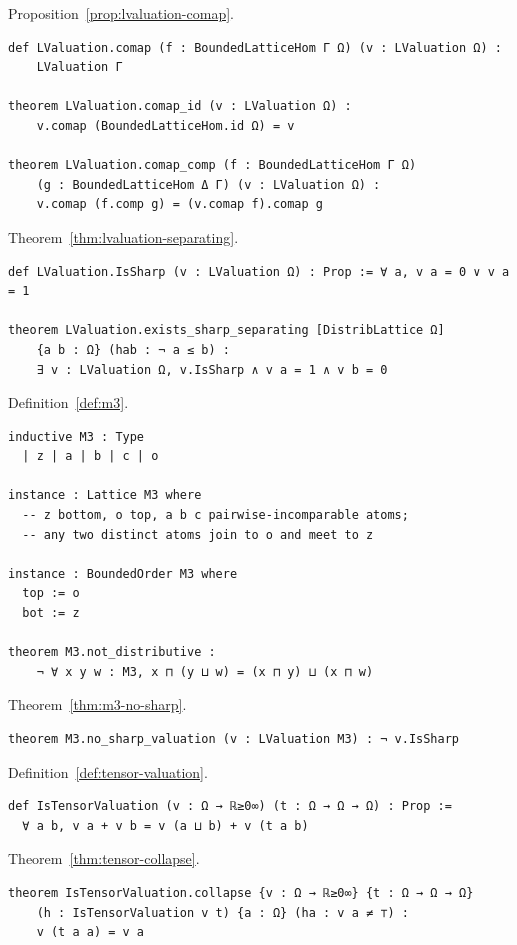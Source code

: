 \noindent Proposition~\ref{prop:lvaluation-comap}.
\label{lean:lvaluation-comap}
\begin{lstlisting}
def LValuation.comap (f : BoundedLatticeHom Γ Ω) (v : LValuation Ω) :
    LValuation Γ

theorem LValuation.comap_id (v : LValuation Ω) :
    v.comap (BoundedLatticeHom.id Ω) = v

theorem LValuation.comap_comp (f : BoundedLatticeHom Γ Ω)
    (g : BoundedLatticeHom Δ Γ) (v : LValuation Ω) :
    v.comap (f.comp g) = (v.comap f).comap g
\end{lstlisting}

\noindent Theorem~\ref{thm:lvaluation-separating}.
\label{lean:lvaluation-separating}
\begin{lstlisting}
def LValuation.IsSharp (v : LValuation Ω) : Prop := ∀ a, v a = 0 ∨ v a = 1

theorem LValuation.exists_sharp_separating [DistribLattice Ω]
    {a b : Ω} (hab : ¬ a ≤ b) :
    ∃ v : LValuation Ω, v.IsSharp ∧ v a = 1 ∧ v b = 0
\end{lstlisting}

\noindent Definition~\ref{def:m3}.
\label{lean:m3}
\begin{lstlisting}
inductive M3 : Type
  | z | a | b | c | o

instance : Lattice M3 where
  -- z bottom, o top, a b c pairwise-incomparable atoms;
  -- any two distinct atoms join to o and meet to z

instance : BoundedOrder M3 where
  top := o
  bot := z

theorem M3.not_distributive :
    ¬ ∀ x y w : M3, x ⊓ (y ⊔ w) = (x ⊓ y) ⊔ (x ⊓ w)
\end{lstlisting}

\noindent Theorem~\ref{thm:m3-no-sharp}.
\label{lean:m3-no-sharp}
\begin{lstlisting}
theorem M3.no_sharp_valuation (v : LValuation M3) : ¬ v.IsSharp
\end{lstlisting}

\noindent Definition~\ref{def:tensor-valuation}.
\label{lean:tensor-valuation}
\begin{lstlisting}
def IsTensorValuation (v : Ω → ℝ≥0∞) (t : Ω → Ω → Ω) : Prop :=
  ∀ a b, v a + v b = v (a ⊔ b) + v (t a b)
\end{lstlisting}

\noindent Theorem~\ref{thm:tensor-collapse}.
\label{lean:tensor-collapse}
\begin{lstlisting}
theorem IsTensorValuation.collapse {v : Ω → ℝ≥0∞} {t : Ω → Ω → Ω}
    (h : IsTensorValuation v t) {a : Ω} (ha : v a ≠ ⊤) :
    v (t a a) = v a
\end{lstlisting}

